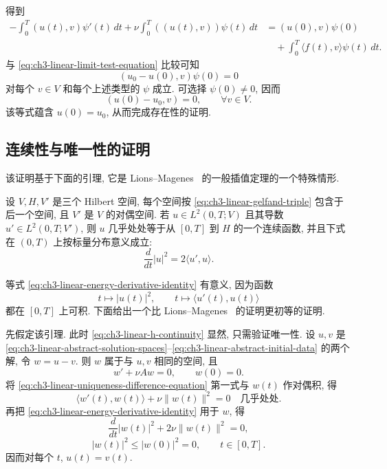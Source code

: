 \hypertarget{chapter-03-page-191}{}
得到
\begin{equation}
\begin{aligned}
-\int_0^T(u(t),v)\psi'(t)\,dt
+\nu\int_0^T((u(t),v))\psi(t)\,dt
&=(u(0),v)\psi(0)\\
&\quad+\int_0^T\langle f(t),v\rangle\psi(t)\,dt.
\end{aligned}
\label{eq:ch3-linear-initial-trace-identity}
\end{equation}
与 \eqref{eq:ch3-linear-limit-test-equation} 比较可知
\[
(u_0-u(0),v)\psi(0)=0
\]
对每个 $v\in V$ 和每个上述类型的 $\psi$ 成立. 可选择 $\psi(0)\ne0$, 因而
\[
(u(0)-u_0,v)=0,
\qquad\forall v\in V.
\]
该等式蕴含 $u(0)=u_0$, 从而完成存在性的证明.

\subsection{连续性与唯一性的证明}
\label{subsec:ch3-linear-continuity-uniqueness}
该证明基于下面的引理, 它是 Lions--Magenes~ 的一般插值定理的一个特殊情形.

\begin{Lemma}
\label{lem:ch3-linear-lions-magenes-continuity}
设 $V,H,V'$ 是三个 Hilbert 空间, 每个空间按 \eqref{eq:ch3-linear-gelfand-triple} 包含于后一个空间, 且 $V'$ 是 $V$ 的对偶空间. 若 $u\in L^2(0,T;V)$ 且其导数 $u'\in L^2(0,T;V')$, 则 $u$ 几乎处处等于从 $[0,T]$ 到 $H$ 的一个连续函数, 并且下式在 $(0,T)$ 上按标量分布意义成立:
\begin{equation}
\frac d{dt}|u|^2=2\langle u',u\rangle.
\label{eq:ch3-linear-energy-derivative-identity}
\end{equation}
\end{Lemma}

等式 \eqref{eq:ch3-linear-energy-derivative-identity} 有意义, 因为函数
\[
t\longmapsto|u(t)|^2,
\qquad
t\longmapsto\langle u'(t),u(t)\rangle
\]
都在 $[0,T]$ 上可积. 下面给出一个比 Lions--Magenes~ 的证明更初等的证明.

先假定该引理. 此时 \eqref{eq:ch3-linear-h-continuity} 显然, 只需验证唯一性. 设 $u,v$ 是 \eqref{eq:ch3-linear-abstract-solution-spaces}--\eqref{eq:ch3-linear-abstract-initial-data} 的两个解, 令 $w=u-v$. 则 $w$ 属于与 $u,v$ 相同的空间, 且
\begin{equation}
w'+\nu Aw=0,
\qquad w(0)=0.
\label{eq:ch3-linear-uniqueness-difference-equation}
\end{equation}
将 \eqref{eq:ch3-linear-uniqueness-difference-equation} 第一式与 $w(t)$ 作对偶积, 得
\[
\langle w'(t),w(t)\rangle+\nu\lVert w(t)\rVert^2=0
\quad\text{几乎处处}.
\]
再把 \eqref{eq:ch3-linear-energy-derivative-identity} 用于 $w$, 得
\[
\frac d{dt}|w(t)|^2+2\nu\lVert w(t)\rVert^2=0,
\]
\[
|w(t)|^2\leq|w(0)|^2=0,
\qquad t\in[0,T].
\]
因而对每个 $t$, $u(t)=v(t)$.

